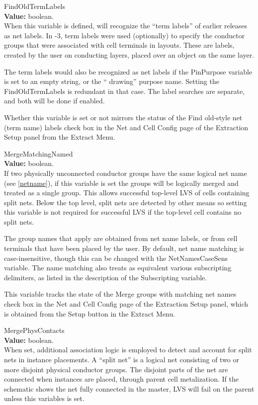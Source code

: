 \begin{description}
\item{\et FindOldTermLabels}\\
{\bf Value:} boolean.\\
When this variable is defined, {\Xic} will recognize the ``term
labels'' of earlier releases as net labels.  In {\Xic}-3, term labels
were used (optionally) to specify the conductor groups that were
associated with cell terminals in layouts.  These are labels, created
by the user on conducting layers, placed over an object on the same
layer.

The term labels would also be recognized as net labels if the {\et
PinPurpose} variable is set to an empty string, or the ``{\vt
drawing}'' purpose name.  Setting the {\et FindOldTermLabels} is
redundant in that case.  The label searches are separate, and both
will be done if enabled.

Whether this variable is set or not mirrors the status of the {\cb
Find old-style net (term name) labels} check box in the {\cb Net and
Cell Config} page of the {\cb Extraction Setup} panel from the {\cb
Extract Menu}.

\item{\et MergeMatchingNamed}\\
{\bf Value:} boolean.\\
If two physically unconnected conductor groups have the same logical
net name (see \ref{netname}), if this variable is set the groups will
be logically merged and treated as a single group.  This allows
successful top-level LVS of cells containing split nets.  Below the
top level, split nets are detected by other means so setting this
variable is not required for successful LVS if the top-level cell
contains no split nets.

The group names that apply are obtained from net name labels, or from
cell terminals that have been placed by the user.  By default, net
name matching is case-insensitive, though this can be changed with the
{\et NetNamesCaseSens} variable.  The name matching also treats as
equivalent various subscripting delimiters, as listed in the
description of the {\et Subscripting} variable.

This variable tracks the state of the {\cb Merge groups with matching
net names} check box in the {\cb Net and Cell Config} page of the {\cb
Extraction Setup} panel, which is obtained from the {\cb Setup} button
in the {\cb Extract Menu}.

\item{\et MergePhysContacts}\\
{\bf Value:} boolean.\\
When set, additional association logic is employed to detect and
account for split nets in instance placements.  A ``split net'' is a
logical net consisting of two or more disjoint physical conductor
groups.  The disjoint parts of the net are connected when instances
are placed, through parent cell metalization.  If the schematic shows
the net fully connected in the master, LVS will fail on the parent
unless this variables is set.


\end{description}
